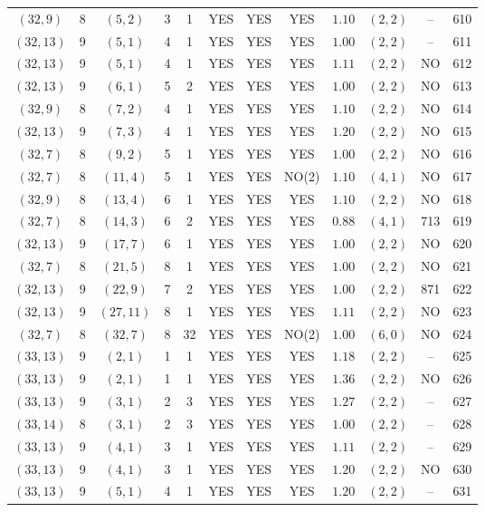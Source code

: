 \begin{longtable}{|c|c|c|c|c|c|c|c|c|c|c|c|}
$(32,9)$ & 8 & $(5,2)$ & 3 & 1 & YES & YES & YES & $1.10$ & $(2,2)$ & -- & 610\\
$(32,13)$ & 9 & $(5,1)$ & 4 & 1 & YES & YES & YES & $1.00$ & $(2,2)$ & -- & 611\\
$(32,13)$ & 9 & $(5,1)$ & 4 & 1 & YES & YES & YES & $1.11$ & $(2,2)$ & NO & 612\\
$(32,13)$ & 9 & $(6,1)$ & 5 & 2 & YES & YES & YES & $1.00$ & $(2,2)$ & NO & 613\\
$(32,9)$ & 8 & $(7,2)$ & 4 & 1 & YES & YES & YES & $1.10$ & $(2,2)$ & NO & 614\\
$(32,13)$ & 9 & $(7,3)$ & 4 & 1 & YES & YES & YES & $1.20$ & $(2,2)$ & NO & 615\\
$(32,7)$ & 8 & $(9,2)$ & 5 & 1 & YES & YES & YES & $1.00$ & $(2,2)$ & NO & 616\\
$(32,7)$ & 8 & $(11,4)$ & 5 & 1 & YES & YES & NO(2) & $1.10$ & $(4,1)$ & NO & 617\\
$(32,9)$ & 8 & $(13,4)$ & 6 & 1 & YES & YES & YES & $1.10$ & $(2,2)$ & NO & 618\\
$(32,7)$ & 8 & $(14,3)$ & 6 & 2 & YES & YES & YES & $0.88$ & $(4,1)$ & 713 & 619\\
$(32,13)$ & 9 & $(17,7)$ & 6 & 1 & YES & YES & YES & $1.00$ & $(2,2)$ & NO & 620\\
$(32,7)$ & 8 & $(21,5)$ & 8 & 1 & YES & YES & YES & $1.00$ & $(2,2)$ & NO & 621\\
$(32,13)$ & 9 & $(22,9)$ & 7 & 2 & YES & YES & YES & $1.00$ & $(2,2)$ & 871 & 622\\
$(32,13)$ & 9 & $(27,11)$ & 8 & 1 & YES & YES & YES & $1.11$ & $(2,2)$ & NO & 623\\
$(32,7)$ & 8 & $(32,7)$ & 8 & 32 & YES & YES & NO(2) & $1.00$ & $(6,0)$ & NO & 624\\
$(33,13)$ & 9 & $(2,1)$ & 1 & 1 & YES & YES & YES & $1.18$ & $(2,2)$ & -- & 625\\
$(33,13)$ & 9 & $(2,1)$ & 1 & 1 & YES & YES & YES & $1.36$ & $(2,2)$ & NO & 626\\
$(33,13)$ & 9 & $(3,1)$ & 2 & 3 & YES & YES & YES & $1.27$ & $(2,2)$ & -- & 627\\
$(33,14)$ & 8 & $(3,1)$ & 2 & 3 & YES & YES & YES & $1.00$ & $(2,2)$ & -- & 628\\
$(33,13)$ & 9 & $(4,1)$ & 3 & 1 & YES & YES & YES & $1.11$ & $(2,2)$ & -- & 629\\
$(33,13)$ & 9 & $(4,1)$ & 3 & 1 & YES & YES & YES & $1.20$ & $(2,2)$ & NO & 630\\
$(33,13)$ & 9 & $(5,1)$ & 4 & 1 & YES & YES & YES & $1.20$ & $(2,2)$ & -- & 631\\

\end{longtable}
